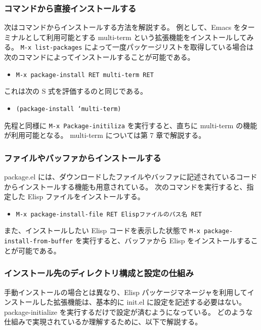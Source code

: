 \subsubsection{コマンドから直接インストールする}
次はコマンドからインストールする方法を解説する。
例として、Emacs をターミナルとして利用可能とする multi-term という拡張機能をインストールしてみる。
\texttt{M-x list-packages} によって一度パッケージリストを取得している場合は次のコマンドによってインストールすることが可能である。
\begin{itemize}\setlength{\leftskip}{-1.00zw}%
\item[] \texttt{M-x package-install RET multi-term RET}
\end{itemize}
これは次の S 式を評価するのと同じである。
\begin{itemize}\setlength{\leftskip}{-1.00zw}%
\item[] \texttt{(package-install `multi-term)}
\end{itemize}
先程と同様に \texttt{M-x Package-initiliza} を実行すると、直ちに multi-term の機能が利用可能となる。
multi-term については第 7 章で解説する。
\subsubsection{ファイルやバッファからインストールする}
package.el には、ダウンロードしたファイルやバッファに記述されているコードからインストールする機能も用意されている。
次のコマンドを実行すると、指定した Elisp ファイルをインストールする。\enlargethispage{0.20zw}
\begin{itemize}\setlength{\leftskip}{-1.00zw}%
\item[] \texttt{M-x package-install-file RET Elispファイルのパス名 RET}
\end{itemize}
また、インストールしたい Elisp コードを表示した状態で \texttt{M-x package-install-from-buffer} を実行すると、バッファから Elisp をインストールすることが可能である。
\subsubsection{インストール先のディレクトリ構成と設定の仕組み}
手動インストールの場合とは異なり、Elisp パッケージマネージャを利用してインストールした拡張機能は、基本的に init.el に設定を記述する必要はない。
package-initialize を実行するだけで設定が済むようになっている。
どのような仕組みで実現されているか理解するために、以下で解説する。\\

